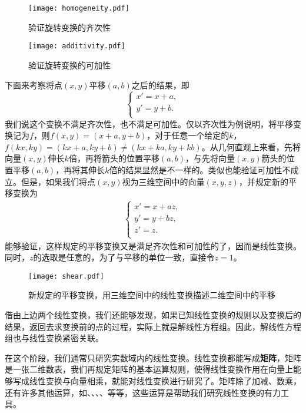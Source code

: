 \begin{figure}[h]
    \centering
    \texttt{[image: homogeneity.pdf]}
    \caption{验证旋转变换的齐次性}
\end{figure}

\begin{figure}[h]
    \centering
    \texttt{[image: additivity.pdf]}
    \caption{验证旋转变换的可加性}
\end{figure}

下面来考察将点$(x,y)$平移$(a,b)$之后的结果，即
\[
    \begin{cases}
        x'=x+a, \\
        y'=y+b. \\
    \end{cases}
    \]
我们说这个变换不满足齐次性，也不满足可加性。仅以齐次性为例说明，将平移变换记为$f$，则$f(x,y)=(x+a,y+b)$，对于任意一个给定的$k$，$f(kx,ky)=(kx+a,ky+b)\ne (kx+ka,ky+kb)$。从几何直观上来看，先将向量$(x,y)$伸长$k$倍，再将箭头的位置平移$(a,b)$，与先将向量$(x,y)$箭头的位置平移$(a,b)$，再将其伸长$k$倍的结果显然是不一样的。类似也能验证可加性不成立。但是，如果我们将点$(x,y)$视为三维空间中的向量$(x,y,z)$，并规定新的平移变换为
\begin{align*}
    \begin{cases}
        x'=x+az, \\
        y'=y+bz, \\
        z'=z .   \\
    \end{cases}
\end{align*}
能够验证，这样规定的平移变换又是满足齐次性和可加性的了，因而是线性变换。同时，$z$的选取是任意的，为了与平移的单位一致，直接令$z=1$。

\begin{figure}[h]
    \centering
    \texttt{[image: shear.pdf]}
    \caption{新规定的平移变换，用三维空间中的线性变换描述二维空间中的平移}
\end{figure}

借由上边两个线性变换，我们还能够发现，如果已知线性变换的规则以及变换后的结果，返回去求变换前的点的过程，实际上就是解线性方程组。因此，解线性方程组也与线性变换紧密关联。

在这个阶段，我们通常只研究实数域内的线性变换。线性变换都能写成\textbf{矩阵}，矩阵是一张二维数表，我们再规定矩阵的基本运算规则，使得线性变换作用在向量上能够写成线性变换与向量相乘，就能对线性变换进行研究了。矩阵除了加减、数乘，还有许多其他运算，如、、、、等等，这些运算是帮助我们研究线性变换的有力工具。

